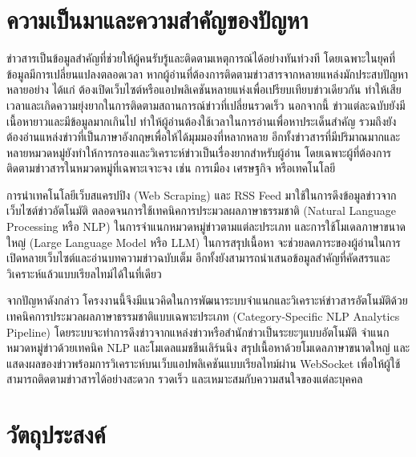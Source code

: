 
\section{ความเป็นมาและความสำคัญของปัญหา}

 ข่าวสารเป็นข้อมูลสำคัญที่ช่วยให้ผู้คนรับรู้และติดตามเหตุการณ์ได้อย่างทันท่วงที โดยเฉพาะในยุคที่ข้อมูลมีการเปลี่ยนแปลงตลอดเวลา หากผู้อ่านที่ต้องการติดตามข่าวสารจากหลายแหล่งมักประสบปัญหาหลายอย่าง ได้แก่ ต้องเปิดเว็บไซต์หรือแอปพลิเคชันหลายแห่งเพื่อเปรียบเทียบข่าวเดียวกัน ทำให้เสียเวลาและเกิดความยุ่งยากในการติดตามสถานการณ์ข่าวที่เปลี่ยนรวดเร็ว นอกจากนี้ ข่าวแต่ละฉบับยังมีเนื้อหายาวและมีข้อมูลมากเกินไป ทำให้ผู้อ่านต้องใช้เวลาในการอ่านเพื่อหาประเด็นสำคัญ รวมถึงยังต้องอ่านแหล่งข่าวที่เป็นภาษาอังกฤษเพื่อให้ได้มุมมองที่หลากหลาย อีกทั้งข่าวสารที่มีปริมาณมากและหลายหมวดหมู่ยังทำให้การกรองและวิเคราะห์ข่าวเป็นเรื่องยากสำหรับผู้อ่าน โดยเฉพาะผู้ที่ต้องการติดตามข่าวสารในหมวดหมู่ที่เฉพาะเจาะจง เช่น การเมือง เศรษฐกิจ หรือเทคโนโลยี

การนำเทคโนโลยีเว็บสแครปปิง (Web Scraping) และ RSS Feed มาใช้ในการดึงข้อมูลข่าวจากเว็บไซต์ข่าวอัตโนมัติ ตลอดจนการใช้เทคนิคการประมวลผลภาษาธรรมชาติ (Natural Language Processing หรือ NLP) ในการจำแนกหมวดหมู่ข่าวตามแต่ละประเภท และการใช้โมเดลภาษาขนาดใหญ่ (Large Language Model หรือ LLM) ในการสรุปเนื้อหา จะช่วยลดภาระของผู้อ่านในการเปิดหลายเว็บไซต์และอ่านบทความข่าวฉบับเต็ม อีกทั้งยังสามารถนำเสนอข้อมูลสำคัญที่คัดสรรและวิเคราะห์แล้วแบบเรียลไทม์ได้ในที่เดียว

จากปัญหาดังกล่าว โครงงานนี้จึงมีแนวคิดในการพัฒนาระบบจำแนกและวิเคราะห์ข่าวสารอัตโนมัติด้วยเทคนิคการประมวลผลภาษาธรรมชาติแบบเฉพาะประเภท (Category-Specific NLP Analytics Pipeline) โดยระบบจะทำการดึงข่าวจากแหล่งข่าวหรือสำนักข่าวเป็นระยะๆแบบอัตโนมัติ จำแนกหมวดหมู่ข่าวด้วยเทคนิค NLP และโมเดลแมชชีนเลิร์นนิง สรุปเนื้อหาด้วยโมเดลภาษาขนาดใหญ่ และแสดงผลของข่าวพร้อมการวิเคราะห์บนเว็บแอปพลิเคชันแบบเรียลไทม์ผ่าน WebSocket เพื่อให้ผู้ใช้สามารถติดตามข่าวสารได้อย่างสะดวก รวดเร็ว และเหมาะสมกับความสนใจของแต่ละบุคคล

\section{วัตถุประสงค์}

